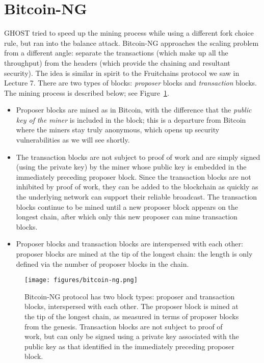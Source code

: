 \documentclass{article}
\begin{document}
\section*{{\sf Bitcoin-NG}}
{\sf GHOST} tried to speed up the mining process while using a different fork choice rule, but ran into the balance attack. {\sf Bitcoin-NG} approaches the scaling problem from a different angle: separate the transactions (which make up all the throughput) from the headers (which provide the chaining and resultant security). The idea is similar in spirit to the {\sf Fruitchains} protocol we saw in Lecture 7. There are two types of blocks: {\em proposer } blocks and {\em transaction} blocks. %
The  mining process is described below; see  Figure~\ref{fig:bitcoin-ng}.  
\begin{itemize}
    \item Proposer blocks are mined as in Bitcoin, with the difference that the {\em public key of the miner} is included in the block; this is a departure from  Bitcoin where the miners stay truly anonymous, which opens up security vulnerabilities as we will see shortly.
    \item The transaction blocks are not subject to proof of work and are simply signed (using the private key) by the miner whose public key is embedded in the immediately preceding proposer block. Since the transaction blocks are not inhibited by proof of work, they can be added to the blockchain as quickly as the underlying network can support their reliable broadcast. The transaction blocks continue to be mined until a new proposer block appears on the longest chain, after which only this new proposer can mine transaction blocks. 
    \item Proposer blocks and transaction blocks are interspersed with each other: proposer blocks are mined at the tip of the longest chain: the length  is only defined via the number of proposer blocks in the chain.  
\end{itemize}


 \begin{figure}
     \centering
     \texttt{[image: figures/bitcoin-ng.png]}
   \caption{{\sf Bitcoin-NG} protocol has two block types: proposer and transaction blocks, interspersed with each other. The proposer block is mined at the tip of the longest chain, as measured in terms of proposer blocks from the genesis. Transaction blocks are not subject to proof of work, but can only be signed using a private key associated with the  public key as that identified in the immediately preceding proposer block.}
   \label{fig:bitcoin-ng}
 \end{figure}
\end{document}
